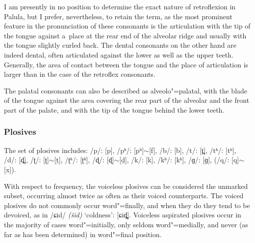


I am presently in no position to determine the exact nature of retroflexion in Palula, but I prefer, nevertheless, to retain the term, as the most prominent feature in the pronunciation of these consonants is the articulation with the tip of the tongue against a~place at the rear end of the alveolar ridge and usually with the tongue slightly curled back. The dental consonants on the other hand are indeed dental, often articulated against the lower as well as the upper teeth. Generally, the area of contact between the tongue and the place of articulation is larger than in the case of the retroflex consonants.


The palatal consonants can also be described as alveolo"=palatal, with the blade of the tongue against the area covering the rear part of the alveolar and the front part of the palate, and with the tip of the tongue behind the lower teeth. 

\subsubsection*{Plosives}
The set of plosives includes: /p/: [p], /pʰ/: [pʰ]$\sim$[f], /b/: [b], /t/: [t̪], /tʰ/: [tʰ], /d/: [d̪], /ʈ/: [ʈ]$\sim$[ṯ], /ʈʰ/: [ʈʰ], /ɖ/: [ɖ]$\sim$[ḏ], /k/: [k], /kʰ/: [kʰ], /ɡ/: [ɡ], (/q/: [q]$\sim$[x]).

With respect to frequency, the voiceless plosives can be considered the unmarked subset, occurring almost twice as often as their voiced counterparts. The voiced plosives do not commonly occur word"=finally, and when they do they tend to be devoiced, as in /ɕid/ \textit{(šid)} `coldness': [ɕid̪̥]. Voiceless aspirated plosives occur in the majority of cases word"=initially, only seldom word"=medially, and never (as far as has been determined) in word"=final position. 


